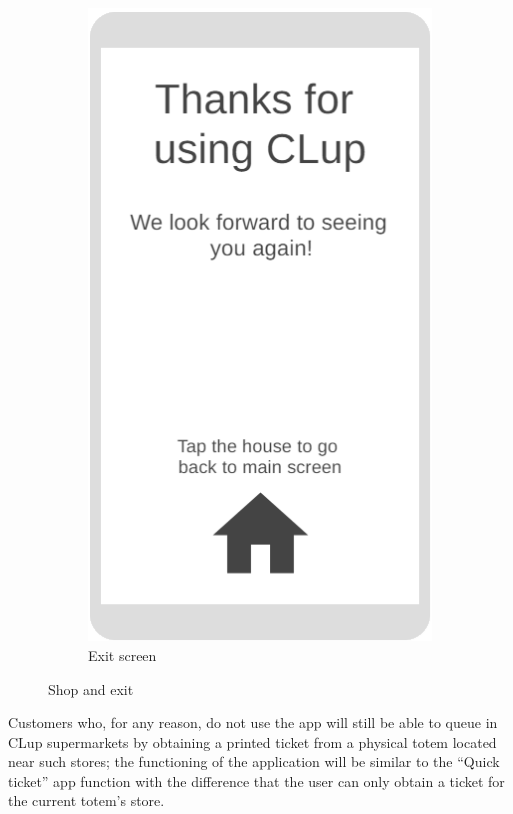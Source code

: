 \begin{figure}[h!]
\begin{subfigure}[b]{0.3\textwidth}
		\includegraphics[width=\linewidth]{../Diagrams/WireframesCLup/FinishNoRating.png}
		\caption{Exit screen}
		\label{fig:WfFinishNoRating}
	\end{subfigure}
	\caption{Shop and exit}
	\label{fig:WireframesExit}
\end{figure}
\pagebreak Customers who, for any reason, do not use the app will still be able to queue in CLup supermarkets by obtaining a printed ticket from a physical totem located near such stores; the functioning of the application will be similar to the “Quick ticket” app function with the difference that the user can only obtain a ticket for the current totem's store. \\
